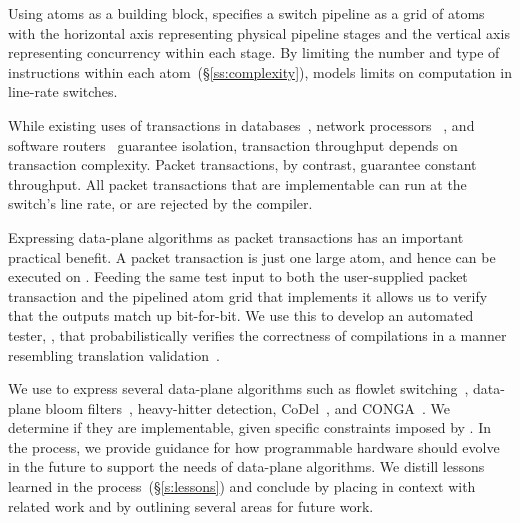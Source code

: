 Using atoms as a building block, \absmachine specifies a switch pipeline as a
grid of atoms with the horizontal axis representing physical pipeline stages
and the vertical axis representing concurrency within each stage.  By limiting
the number and type of instructions within each atom~(\S\ref{ss:complexity}),
\absmachine models limits on computation in line-rate switches.

While existing uses of transactions in databases~\cite{db_trans}, network
processors ~\cite{npus}, and software routers~\cite{click} guarantee isolation,
transaction throughput depends on transaction complexity. Packet transactions,
by contrast, guarantee constant throughput. All packet transactions that are
implementable can run at the switch's line rate, or are rejected by the compiler.

Expressing data-plane algorithms as packet transactions has an important
practical benefit.  A packet transaction is just one large atom, and hence can
be executed on \absmachine.  Feeding the same test input to both the
user-supplied packet transaction and the pipelined atom grid that implements it
allows us to verify that the outputs match up bit-for-bit. We use this to
develop an automated tester, \tester, that probabilistically verifies the
correctness of compilations in a manner resembling translation
validation~\cite{necula_validation}.

We use \pktlanguage to express several data-plane algorithms such as flowlet
switching~\cite{flowlet}, data-plane bloom filters~\cite{bloom}, heavy-hitter
detection, CoDel~\cite{codel}, and CONGA~\cite{conga}. We determine if they are
implementable, given specific constraints imposed by \absmachine. In the
process, we provide guidance for how programmable hardware should evolve in the
future to support the needs of data-plane algorithms.  We distill lessons
learned in the process~(\S\ref{s:lessons}) and conclude by placing \pktlanguage
in context with related work and by outlining several areas for future work.

